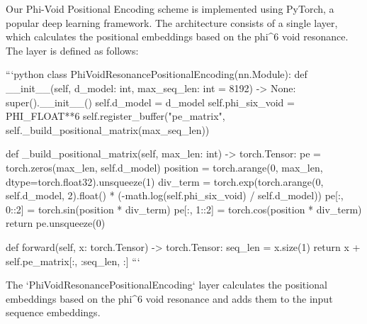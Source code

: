 Our Phi-Void Positional Encoding scheme is implemented using PyTorch, a popular deep learning framework. The architecture consists of a single layer, which calculates the positional embeddings based on the phi^6 void resonance. The layer is defined as follows:

```python
class PhiVoidResonancePositionalEncoding(nn.Module):
    def __init__(self, d_model: int, max_seq_len: int = 8192) -> None:
        super().__init__()
        self.d_model = d_model
        self.phi_six_void = PHI_FLOAT**6
        self.register_buffer("pe_matrix", self._build_positional_matrix(max_seq_len))

    def _build_positional_matrix(self, max_len: int) -> torch.Tensor:
        pe = torch.zeros(max_len, self.d_model)
        position = torch.arange(0, max_len, dtype=torch.float32).unsqueeze(1)
        div_term = torch.exp(torch.arange(0, self.d_model, 2).float() * (-math.log(self.phi_six_void) / self.d_model))
        pe[:, 0::2] = torch.sin(position * div_term)
        pe[:, 1::2] = torch.cos(position * div_term)
        return pe.unsqueeze(0)

    def forward(self, x: torch.Tensor) -> torch.Tensor:
        seq_len = x.size(1)
        return x + self.pe_matrix[:, :seq_len, :]
```

The `PhiVoidResonancePositionalEncoding` layer calculates the positional embeddings based on the phi^6 void resonance and adds them to the input sequence embeddings.